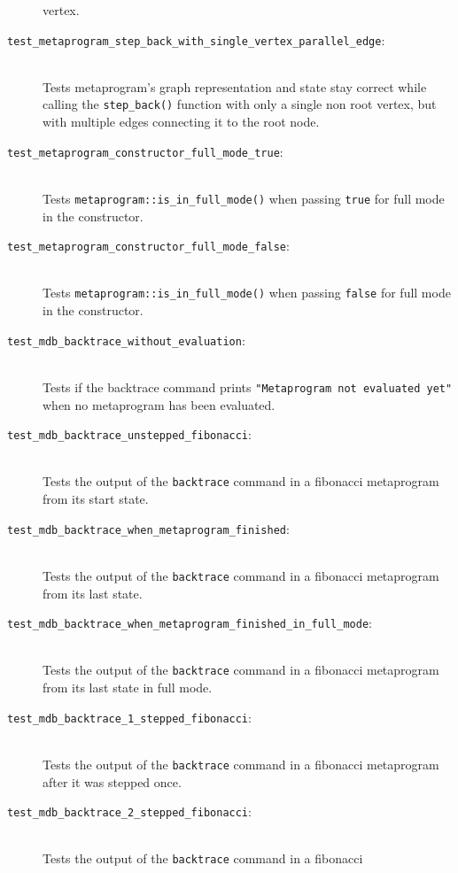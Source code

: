 \begin{description}
        vertex.
    \item[\texttt{test\_metaprogram\_step\_back\_with\_single\_vertex\_parallel\_edge}:] \hfill \\
        Tests metaprogram's graph representation and state stay correct while
        calling the \texttt{step\_back()} function with only a single non root
        vertex, but with multiple edges connecting it to the root node.
    \item[\texttt{test\_metaprogram\_constructor\_full\_mode\_true}:] \hfill \\
        Tests \texttt{metaprogram::is\_in\_full\_mode()} when passing
        \texttt{true} for full mode in the constructor.
    \item[\texttt{test\_metaprogram\_constructor\_full\_mode\_false}:] \hfill \\
        Tests \texttt{metaprogram::is\_in\_full\_mode()} when passing
        \texttt{false} for full mode in the constructor.
    \item[\texttt{test\_mdb\_backtrace\_without\_evaluation}:] \hfill \\
        Tests if the backtrace command prints
        \texttt{"Metaprogram not evaluated yet"} when no metaprogram has been
        evaluated.
    \item[\texttt{test\_mdb\_backtrace\_unstepped\_fibonacci}:] \hfill \\
        Tests the output of the \texttt{backtrace} command in a fibonacci
        metaprogram from its start state.
    \item[\texttt{test\_mdb\_backtrace\_when\_metaprogram\_finished}:] \hfill \\
        Tests the output of the \texttt{backtrace} command in a fibonacci
        metaprogram from its last state.
    \item[\texttt{test\_mdb\_backtrace\_when\_metaprogram\_finished\_in\_full\_mode}:] \hfill \\
        Tests the output of the \texttt{backtrace} command in a fibonacci
        metaprogram from its last state in full mode.
    \item[\texttt{test\_mdb\_backtrace\_1\_stepped\_fibonacci}:] \hfill \\
        Tests the output of the \texttt{backtrace} command in a fibonacci
        metaprogram after it was stepped once.
    \item[\texttt{test\_mdb\_backtrace\_2\_stepped\_fibonacci}:] \hfill \\
        Tests the output of the \texttt{backtrace} command in a fibonacci

\end{description}
